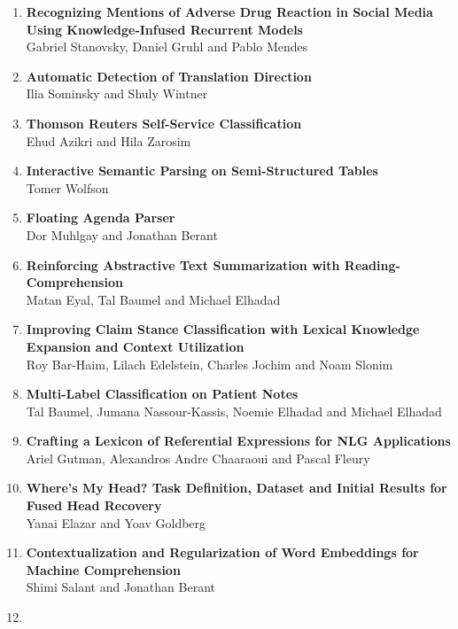 \documentclass[a0,portrait]{a0poster}
\begin{document}
{\begin{enumerate}
        Elior Sulem, Omri Abend and Ari Rappoport
        \item
        \textbf{Recognizing Mentions of Adverse Drug Reaction in Social Media
        Using Knowledge-Infused Recurrent Models}\\
        Gabriel Stanovsky, Daniel Gruhl and Pablo Mendes
        \item
        \textbf{Automatic Detection of Translation Direction}\\
        Ilia Sominsky and Shuly Wintner
        \item
        \textbf{Thomson Reuters Self-Service Classification}\\
        Ehud Azikri and Hila Zarosim
        \item
        \textbf{Interactive Semantic Parsing on Semi-Structured Tables}\\
        Tomer Wolfson
        \item
        \textbf{Floating Agenda Parser}\\
        Dor Muhlgay and Jonathan Berant
        \item
        \textbf{Reinforcing Abstractive Text Summarization with
        Reading-Comprehension}\\
        Matan Eyal, Tal Baumel and Michael Elhadad
        \item
        \textbf{Improving Claim Stance Classification with Lexical Knowledge
        Expansion and Context Utilization}\\
        Roy Bar-Haim, Lilach Edelstein, Charles Jochim and Noam Slonim
        \item
        \textbf{Multi-Label Classification on Patient Notes}\\
        Tal Baumel, Jumana Nassour-Kassis, Noemie Elhadad and Michael Elhadad
        \item
        \textbf{Crafting a Lexicon of Referential Expressions for NLG Applications}\\
        Ariel Gutman, Alexandros Andre Chaaraoui and Pascal Fleury
        \item
        \textbf{Where's My Head?
        Task Definition, Dataset and Initial Results for Fused Head Recovery}\\
        Yanai Elazar and Yoav Goldberg
        \item
        \textbf{Contextualization and Regularization of Word Embeddings for
        Machine Comprehension}\\
        Shimi Salant and Jonathan Berant
        \item

\end{enumerate}}
\end{document}
